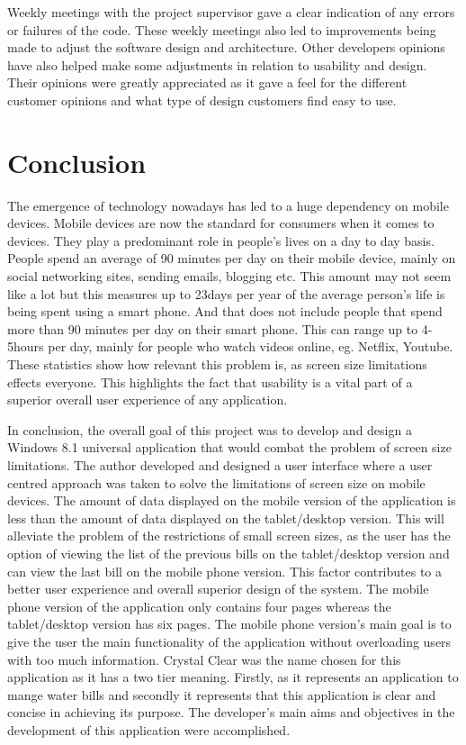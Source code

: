 \documentclass[runningheads,a4paper]{llncs}
\begin{document}
\begin{inparaenum}[]
Weekly meetings with the project supervisor gave a clear indication of any errors or failures of the code. These weekly meetings also led to improvements being made to adjust the software design and architecture. Other developers opinions have also helped make some adjustments in relation to usability and design. Their opinions were greatly appreciated as it gave a feel for the different customer opinions and what type of design customers find easy to use. 
\end{inparaenum}


\section{Conclusion}
\label{sec:Conclusion}
The emergence of technology nowadays has led to a huge dependency on mobile devices. Mobile devices are now the standard for consumers when it comes to devices. They play a predominant role in people's lives on a day to day basis. People spend an average of 90 minutes per day on their mobile device, mainly on social networking sites, sending emails, blogging etc. This amount may not seem like a lot but this measures up to 23days per year of the average person's life is being spent using a smart phone. And that does not include people that spend more than 90 minutes per day on their smart phone. This can range up to 4-5hours per day, mainly for people who watch videos online,  eg. Netflix, Youtube. These statistics show how relevant this problem is, as screen size limitations effects everyone. This highlights the fact that usability is a vital part of a superior overall user experience of any application. 

\begin{inparaenum}[]
In conclusion, the overall goal of this project was to develop and design a Windows 8.1 universal application that would combat the problem of screen size limitations. The author developed and designed a user interface where a user centred approach was taken to solve the limitations of screen size on mobile devices. The amount of data displayed on the mobile version of the application is less than the amount of data displayed on the tablet/desktop version. This will alleviate the problem of the restrictions of small screen sizes, as the user has the option of viewing the list of the previous bills on the tablet/desktop version and can view the last bill on the mobile phone version. This factor contributes to a better user experience and overall superior design of the system. The mobile phone version of the application only contains four pages whereas the tablet/desktop version has six pages. The mobile phone version's main goal is to give the user the main functionality of the application without overloading users with too much information. Crystal Clear was the name chosen for this application as it has a two tier meaning. Firstly, as it represents an application to mange water bills and secondly it represents that this application is clear and concise in achieving its purpose. The developer's main aims and objectives in the development of this application were accomplished.
\end{inparaenum}
\end{document}
